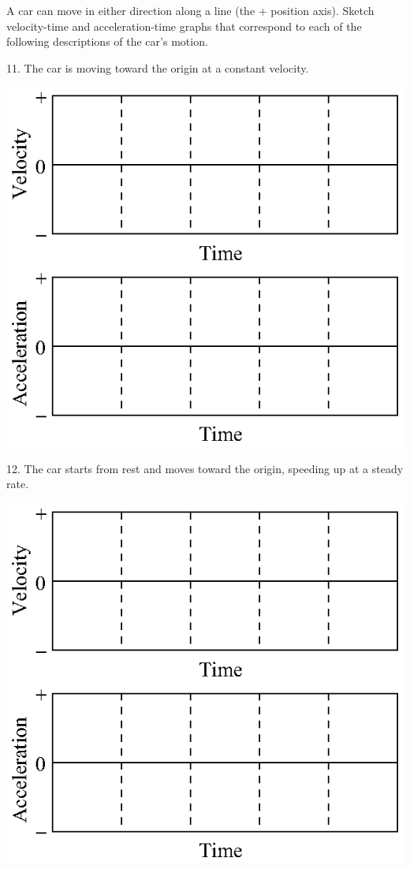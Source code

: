 A car can move in either direction along a line (the + position axis). Sketch
velocity-time and acceleration-time graphs that correspond to each of the following
descriptions of the car's motion.

11. The car is moving toward the origin at a constant velocity.

\vspace{0.3cm}
{\par\centering \includegraphics{slowing/slowing_fig15.eps} \par}
\vspace{0.3cm}

12. The car starts from rest and moves toward the origin, speeding up at a steady
rate.

\vspace{0.3cm}
{\par\centering \includegraphics{slowing/slowing_fig15.eps} \par}
\vspace{0.3cm}

